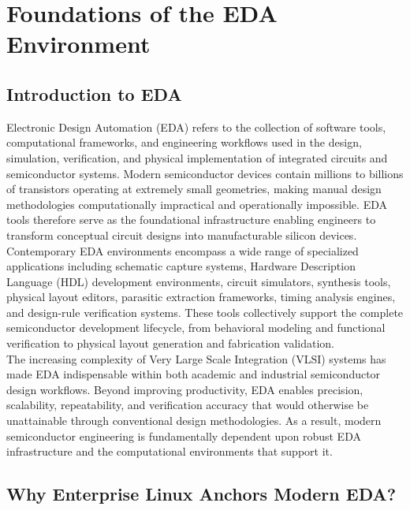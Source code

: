
\chapter{Foundations of the EDA Environment}


\section{Introduction to EDA}

Electronic Design Automation (EDA) refers to the collection of software tools, computational frameworks, and engineering workflows used in the design, simulation, verification, and physical implementation of integrated circuits and semiconductor systems. Modern semiconductor devices contain millions to billions of transistors operating at extremely small geometries, making manual design methodologies computationally impractical and operationally impossible. EDA tools therefore serve as the foundational infrastructure enabling engineers to transform conceptual circuit designs into manufacturable silicon devices. \\ 

Contemporary EDA environments encompass a wide range of specialized applications including schematic capture systems, Hardware Description Language (HDL) development environments, circuit simulators, synthesis tools, physical layout editors, parasitic extraction frameworks, timing analysis engines, and design-rule verification systems. These tools collectively support the complete semiconductor development lifecycle, from behavioral modeling and functional verification to physical layout generation and fabrication validation.\\

The increasing complexity of Very Large Scale Integration (VLSI) systems has made EDA indispensable within both academic and industrial semiconductor design workflows. Beyond improving productivity, EDA enables precision, scalability, repeatability, and verification accuracy that would otherwise be unattainable through conventional design methodologies. As a result, modern semiconductor engineering is fundamentally dependent upon robust EDA infrastructure and the computational environments that support it.\\

\section{Why Enterprise Linux Anchors Modern EDA?}

